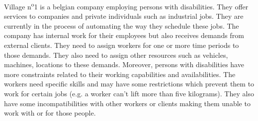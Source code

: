 \documentclass[../thesis.tex]{subfiles}
\begin{document}
Village n\textsuperscript{o}1 is a belgian company employing persons with disabilities.
They offer services to companies and private individuals such as industrial jobs.
They are currently in the process of automating the way they schedule these jobs. 
The company has internal work for their employees but also receives demands from external clients.
They need to assign workers for one or more time periods to those demands. They also need to assign other resources
such as vehicles, machines, locations to these demands.
Moreover, persons with disabilities have more constraints related to their working capabilities and
availabilities. The workers need specific skills and may have some restrictions which
prevent them to work for certain jobs (e.g. a worker can't lift more than five kilograms).
They also have some incompatibilities with other workers or clients making them unable to work with or for those people.
\end{document}
